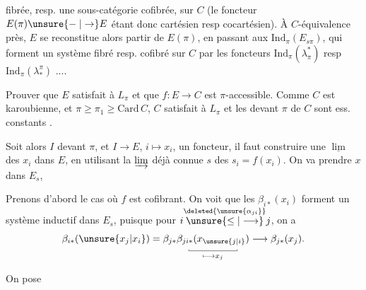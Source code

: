 fibrée, resp. une sous-catégorie cofibrée, sur $C$ (le foncteur $E(\pi)\unsure{\relbar|\to}E$ étant donc cartésien resp cocartésien). À $C$-équivalence près, $E$ se reconstitue alors  partir de $E(\pi)$, en passant aux $\mathrm{Ind}_\pi(E_{s\pi})$,  qui forment un système fibré resp. cofibré sur $C$ par les foncteurs $\mathrm{Ind}_\pi(\lambda^\ast_\pi)$ resp $\mathrm{Ind}_\pi(\lambda_*^\pi)$ ....


Prouver que $E$ satisfait à $L_\pi$ et que $f:E\to C$ est $\pi$-accessible. Comme $C$ est karoubienne, et $\pi\geq\pi_1\geq\mathrm{Card}\,C$, $C$ satisfait à $L_\pi$ et les    devant $\pi$ de $C$ sont ess. constants .

Soit alors $I$  devant $\pi$, et $I\longrightarrow E$, $i\mapsto x_i$, un foncteur, il faut construire une $\underline{\lim}$ des $x_i$ dans $E$, en utilisant la $\varinjlim$ déjà connue $s$ des $s_i=f(x_i)$.  On va prendre  $x$ dans $E_s$,

Prenons d'abord le cas où $f$ est cofibrant. On voit que les  $\beta_{i*}(x_i)$ forment un système inductif dans $E_s$, puisque pour
$i\overset{\deleted{\unsure{\alpha_{ji}}}}{\unsure{\leq|\longrightarrow}}j$, on a
\[ \beta_{i*}(\unsure{x_j|x_i})=\beta_{j*}\underset{\longmapsto x_j}{\underset{\rule{.35pt}{.4ex}\rule{4.9em}{.35pt}\rule{.35pt}{.4ex}}{\beta_{ji*}(x_{\unsure{j|i}})}}\longrightarrow\beta_{j*}(x_j). \]

On  pose

